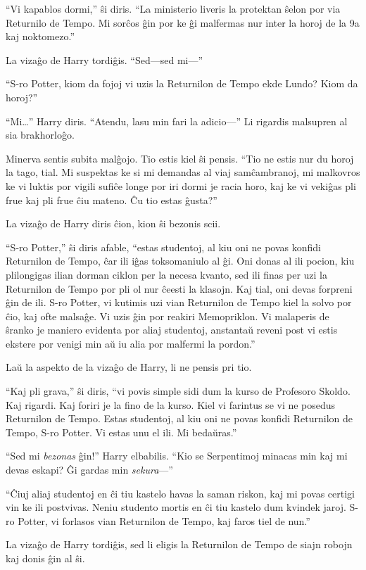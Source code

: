 ``Vi kapablos dormi,'' ŝi diris. ``La ministerio liveris la protektan
ŝelon por via Returnilo de Tempo. Mi sorĉos ĝin por ke ĝi malfermas nur
inter la horoj de la 9a kaj noktomezo.''

La vizaĝo de Harry tordiĝis. ``Sed—sed mi—''

``S-ro Potter, kiom da fojoj vi uzis la Returnilon de Tempo ekde
Lundo? Kiom da horoj?''

``Mi\ldots'' Harry diris. ``Atendu, lasu min fari la adicio—'' Li
rigardis malsupren al sia brakhorloĝo.

Minerva sentis subita malĝojo. Tio estis kiel ŝi pensis. ``Tio ne
estis nur du horoj la tago, tial. Mi suspektas ke si mi demandas al
viaj samĉambranoj, mi malkovros ke vi luktis por vigili sufiĉe longe
por iri dormi je racia horo, kaj ke vi vekiĝas pli frue kaj pli frue
ĉiu mateno. Ĉu tio estas ĝusta?''

La vizaĝo de Harry diris ĉion, kion ŝi bezonis scii.


``S-ro Potter,'' ŝi diris afable, ``estas studentoj, al kiu oni ne
povas konfidi Returnilon de Tempo, ĉar ili iĝas toksomaniulo al
ĝi. Oni donas al ili pocion, kiu plilongigas ilian dorman ciklon per
la necesa kvanto, sed ili finas per uzi la Returnilon de Tempo por pli
ol nur ĉeesti la klasojn. Kaj tial, oni devas forpreni ĝin de
ili. S-ro Potter, vi kutimis uzi vian Returnilon de Tempo kiel la
solvo por ĉio, kaj ofte malsaĝe. Vi uzis ĝin por reakiri
Memopriklon. Vi malaperis de ŝranko je maniero evidenta por aliaj
studentoj, anstantaŭ reveni post vi estis ekstere por venigi min aŭ
iu alia por malfermi la pordon.''

Laŭ la aspekto de la vizaĝo de Harry, li ne pensis pri tio.

``Kaj pli grava,'' ŝi diris, ``vi povis simple sidi dum la kurso de
Profesoro Skoldo. Kaj rigardi. Kaj foriri je la fino de la kurso. Kiel
vi farintus se vi ne posedus Returnilon de Tempo. Estas studentoj, al
kiu oni ne povas konfidi Returnilon de Tempo, S-ro Potter. Vi estas
unu el ili. Mi bedaŭras.''

``Sed mi \emph{bezonas} ĝin!'' Harry elbabilis. ``Kio se Serpentimoj
minacas min kaj mi devas eskapi? Ĝi gardas min \emph{sekura}—''  

``Ĉiuj aliaj studentoj en ĉi tiu kastelo havas la saman riskon, kaj mi
povas certigi vin ke ili postvivas. Neniu studento mortis en ĉi tiu
kastelo dum kvindek jaroj. S-ro Potter, vi forlasos vian Returnilon de
Tempo, kaj faros tiel de nun.''

La vizaĝo de Harry tordiĝis, sed li eligis la Returnilon de Tempo de
siajn robojn kaj donis ĝin al ŝi.

